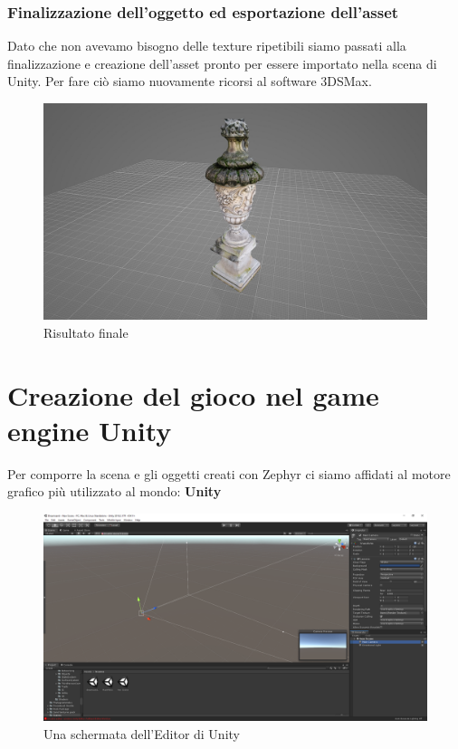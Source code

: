 \documentclass[12pt]{report}
\begin{document}
\subsection{Finalizzazione dell'oggetto ed esportazione dell'asset}
Dato che non avevamo bisogno delle texture ripetibili siamo passati alla finalizzazione e creazione dell'asset pronto per essere importato nella scena di Unity. Per fare ci\`o siamo nuovamente ricorsi al software 3DSMax.
\begin{figure}[H]
    \centering
    \includegraphics[width = 0.95\linewidth]{img/statua_fine.jpg}
    \caption{Risultato finale}
\end{figure}

\chapter{Creazione del gioco nel game engine Unity}
Per comporre la scena e gli oggetti creati con Zephyr ci siamo affidati al motore grafico pi\`u utilizzato al mondo: \textbf{Unity}

\begin{figure}[H]
    \centering
    \includegraphics[width = \linewidth]{img/empty-scene.png}
    \caption{Una schermata dell'Editor di Unity}
\end{figure}
\end{document}
